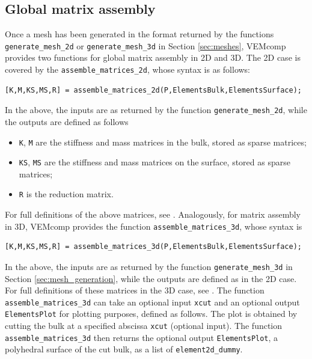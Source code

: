 \documentclass[a4paper]{article}
\begin{document}
\subsection{Global matrix assembly}
Once a mesh has been generated in the format returned by the functions \texttt{generate\_mesh\_2d} or  \texttt{generate\_mesh\_3d} in Section \ref{sec:meshes},  VEMcomp provides two functions for global matrix assembly in 2D and 3D. The 2D case is covered by the \texttt{assemble\_matrices\_2d}, whose syntax is as follows:
\begin{lstlisting}
[K,M,KS,MS,R] = assemble_matrices_2d(P,ElementsBulk,ElementsSurface);
\end{lstlisting}
In the above, the inputs are as returned by the function \texttt{generate\_mesh\_2d}, while the outputs are defined as follows
\begin{itemize}
\item \texttt{K}, \texttt{M} are the stiffness and mass matrices in the bulk, stored as sparse matrices;
\item \texttt{KS}, \texttt{MS} are the stiffness and mass matrices on the surface, stored as sparse matrices;
\item \texttt{R} is the reduction matrix.
\end{itemize}
For full definitions of the above matrices, see \cite{frittelli2021bulk}. Analogously,  for matrix assembly in 3D, VEMcomp provides the function \texttt{assemble\_matrices\_3d}, whose syntax is
\begin{lstlisting}
[K,M,KS,MS,R] = assemble_matrices_3d(P,ElementsBulk,ElementsSurface);
\end{lstlisting}
In the above,  the inputs are as returned by the function \texttt{generate\_mesh\_3d} in Section \ref{sec:mesh_generation}, while the outputs are defined as in the 2D case.  For full definitions of these matrices in the 3D case, see \cite{frittelli2023elliptic}. The function \texttt{assemble\_matrices\_3d} can take an optional input \texttt{xcut} and an optional output \texttt{ElementsPlot} for plotting purposes, defined as follows.  The plot is obtained by cutting the bulk at a specified abscissa \texttt{xcut} (optional input). The function \texttt{assemble\_matrices\_3d} then returns the optional output \texttt{ElementsPlot}, a polyhedral surface of the cut bulk,  as a list of \texttt{element2d\_dummy}.
\end{document}
